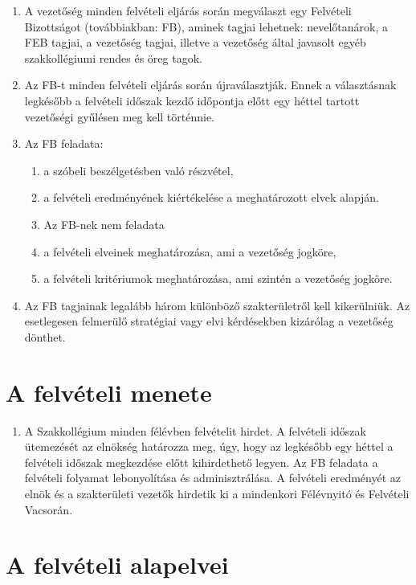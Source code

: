 \documentclass[12pt]{report}
\begin{document}
\begin{enumerate}
  \item A vezetőség minden felvételi eljárás során megválaszt egy Felvételi Bizottságot (továbbiakban: FB), aminek tagjai lehetnek: nevelőtanárok, a FEB tagjai, 
    a vezetőség tagjai, illetve a vezetőség által javasolt egyéb szakkollégiumi rendes és öreg tagok.
  \item Az FB-t minden felvételi eljárás során újraválasztják. Ennek a választásnak legkésőbb a felvételi időszak kezdő időpontja előtt egy héttel tartott 
    vezetőségi gyűlésen meg kell történnie.
  \item Az FB feladata:
  \begin{enumerate}
    \item a szóbeli beszélgetésben való részvétel,
    \item a felvételi eredményének kiértékelése a meghatározott elvek alapján.
    \item Az FB-nek nem feladata
    \item a felvételi elveinek meghatározása, ami a vezetőség jogköre,
    \item a felvételi kritériumok meghatározása, ami szintén a vezetőség jogköre.
  \end{enumerate}
  \item Az FB tagjainak legalább három különböző szakterületről kell kikerülniük. Az esetlegesen felmerülő stratégiai vagy elvi kérdésekben kizárólag a vezetőség dönthet.
\end{enumerate}

\section{A felvételi menete}

\begin{enumerate}
  \item A Szakkollégium minden félévben felvételit hirdet. A felvételi időszak ütemezését az elnökség határozza meg, úgy, hogy az legkésőbb egy héttel a felvételi 
    időszak megkezdése előtt kihirdethető legyen. Az FB feladata a felvételi folyamat lebonyolítása és adminisztrálása. A felvételi eredményét az elnök és a 
    szakterületi vezetők hirdetik ki a mindenkori Félévnyitó és Felvételi Vacsorán.
\end{enumerate}

\section{A felvételi alapelvei}
\end{document}
